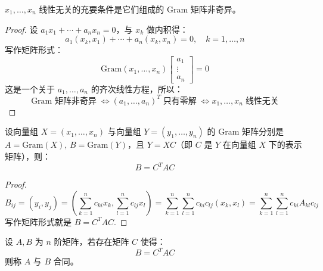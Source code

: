 \begin{definition}
$x_1,\ldots,x_n$ 线性无关的充要条件是它们组成的 Gram 矩阵非奇异。
\end{definition}
\begin{proof}
设 $a_1x_1+\cdots+a_nx_n=0$，与 $x_k$ 做内积得：
\[
    a_1(x_k,x_1)+\cdots+a_n(x_k,x_n)=0,\quad k=1,\ldots,n
\]
写作矩阵形式：
\[
    \text{Gram}(x_1,\ldots,x_n)\begin{bmatrix}a_1\\\vdots\\a_n\end{bmatrix}=0
\]
这是一个关于 $a_1,\ldots,a_n$ 的齐次线性方程，所以：
\[
\text{Gram 矩阵非奇异}\;\iff (a_1,\ldots,a_n)^T \;\text{只有零解}\; \iff x_1,\ldots,x_n\;\text{线性无关}
\]
\end{proof}

\begin{theorem}
设向量组 $X=(x_1,\ldots,x_n)$ 与向量组 $Y=(y_1,\ldots,y_n)$ 的 Gram 矩阵分别是 $A=\text{Gram}(X),\,B=\text{Gram}(Y)$，且 $Y=XC$（即 $C$ 是 $Y$ 在向量组 $X$ 下的表示矩阵），则：
\[
    B=C^TAC
\]
\end{theorem}
\begin{proof}
\[
    B_{ij}=(y_i,y_j)=\left(\sum_{k=1}^nc_{ki}x_k,\sum_{l=1}^nc_{lj}x_l\right)=\sum_{k=1}^n\sum_{l=1}^nc_{ki}c_{lj}(x_k,x_l)=\sum_{k=1}^n\sum_{l=1}^nc_{ki}A_{kl}c_{lj}
\]
写作矩阵形式就是 $B=C^TAC$.
\end{proof}

\begin{definition}[合同]
设 $A,B$ 为 $n$ 阶矩阵，若存在矩阵 $C$ 使得：
\[
B=C^TAC
\]
则称 $A$ 与 $B$ 合同。
\end{definition}

